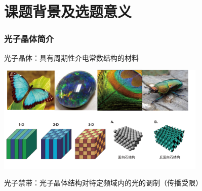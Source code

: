 \documentclass{beamer}
\begin{document}
\section{课题背景及选题意义}
\begin{frame}
  \frametitle{光子晶体简介}
  光子晶体：具有周期性介电常数结构的材料
  \pause
  \begin{center}
    \includegraphics[width=10cm]{figures/PhC.png}
  \end{center}
  \pause
  光子禁带：光子晶体结构对特定频域内的光的调制（传播受限）
\end{frame}
\end{document}
